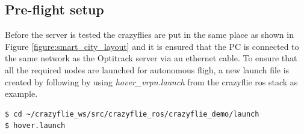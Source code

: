 \subsection{Pre-flight setup}
Before the server is tested the crazyflies are put in the same place as shown in Figure \ref{figure:smart_city_layout} and it is ensured that the PC is connected to the same network as the Optitrack server via an ethernet cable. To ensure that all the required nodes are launched for autonomous fligh, a new launch file is created by following by using \textit{hover\_vrpn.launch} from the crazyflie ros stack as example.
\begin{mdframed}[backgroundcolor=light-gray, linecolor=light-gray]
\begin{verbatim}
$ cd ~/crazyflie_ws/src/crazyflie_ros/crazyflie_demo/launch
$ hover.launch
\end{verbatim}
\end{mdframed}

